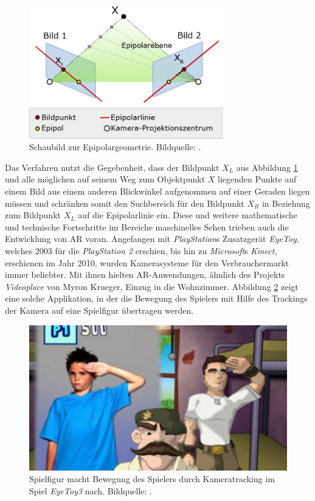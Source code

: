 \begin{figure}[H]
	\centering
	\includegraphics[width=0.75\textwidth]{figuren/Epipolargeometrie}
	\caption{Schaubild zur Epipolargeometrie. Bildquelle: \cite{epipolargeometrie}.}
	\label{fig:stereo_epipolargeometrie}
\end{figure}
Das Verfahren nutzt die Gegebenheit, dass der Bildpunkt $X_{L}$ aus Abbildung \ref{fig:stereo_epipolargeometrie} und alle möglichen auf seinem Weg zum Objektpunkt $X$ liegenden Punkte auf einem Bild aus einem anderen Blickwinkel aufgenommen auf einer Geraden liegen müssen und schränken somit den Suchbereich für den Bildpunkt $X_{R}$ in Beziehung zum Bildpunkt $X_{L}$ auf die Epipolarlinie ein. Diese und weitere mathematische und technische Fortschritte im Bereiche maschinelles Sehen trieben auch die Entwicklung von AR voran. Angefangen mit \textit{PlayStation}s Zusatzgerät \textit{EyeToy}, welches 2003 für die \textit{PlayStation 2} erschien, bis hin zu \textit{Microsoft}s \textit{Kinect}, erschienen im Jahr 2010, wurden Kamerasysteme für den Verbrauchermarkt immer beliebter. Mit ihnen hielten AR-Anwendungen, ähnlich des Projekts \textit{Videoplace} von Myron Krueger, Einzug in die Wohnzimmer. Abbildung \ref{fig:eyeToy3} zeigt eine solche Applikation, in der die Bewegung des Spielers mit Hilfe des Trackings der Kamera auf eine Spielfigur übertragen werden.
\begin{figure}[H]
	\centering
	\includegraphics[width=1.0\textwidth]{figuren/eyetoyplay3}
	\caption{Spielfigur macht Bewegung des Spielers durch Kameratracking im Spiel \textit{EyeToy3} nach. Bildquelle: \cite{eyeToy}.}
	\label{fig:eyeToy3}
\end{figure}
